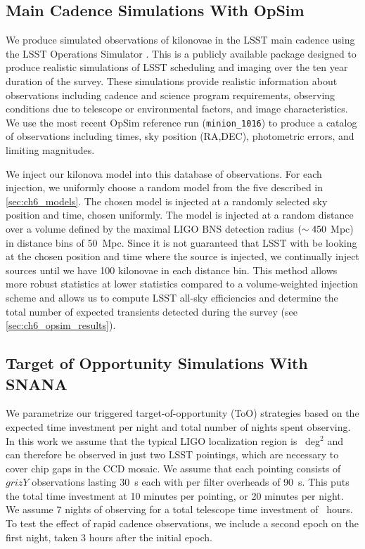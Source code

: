 \subsection{Main Cadence Simulations With OpSim}
\label{sec:ch6_opsim}
We produce simulated observations of kilonovae in the LSST main cadence using the LSST Operations Simulator \citep[OpSim,][]{OpSim1,OpSim2}. This is a publicly available package designed to produce realistic simulations of LSST scheduling and imaging over the ten year duration of the survey. These simulations provide realistic information about observations including cadence and science program requirements, observing conditions due to telescope or environmental factors, and image characteristics. We use the most recent OpSim reference run ({\tt minion\_1016}) to produce a catalog of observations including times, sky position (RA,DEC), photometric errors, and limiting magnitudes.

We inject our kilonova model into this database of observations. For each injection, we uniformly choose a random model from the five described in \cref{sec:ch6_models}. The chosen model is injected at a randomly selected sky position and time, chosen uniformly. The model is injected at a random  
distance over a volume defined by the maximal LIGO BNS detection radius $(\sim 450$ Mpc) in distance bins of 50~Mpc. Since it is not guaranteed that LSST with be looking at the chosen position and time where the source is injected, we continually inject sources until we have 100 kilonovae in each distance bin. This method allows more robust statistics at lower statistics compared to a volume-weighted injection scheme and allows us to compute LSST all-sky efficiencies and determine the total number of expected transients detected during the survey (see \cref{sec:ch6_opsim_results}).

\subsection{Target of Opportunity Simulations With SNANA}
\label{sec:ch6_snana}
We parametrize our triggered target-of-opportunity (ToO) strategies based on the expected time investment per night and total number of nights spent observing. In this work we assume that the typical LIGO localization region is ~deg$^2$ and can therefore be observed in just two LSST pointings, which are necessary to cover chip gaps in the CCD mosaic. We assume that each pointing consists of $grizY$ observations lasting 30~s each with per filter overheads of 90~s. This puts the total time investment at 10 minutes per pointing, or 20 minutes per night. We assume 7 nights of observing for a total telescope time investment of ~hours. To test the effect of rapid cadence observations, we include a second epoch on the first night, taken 3 hours after the initial epoch.

